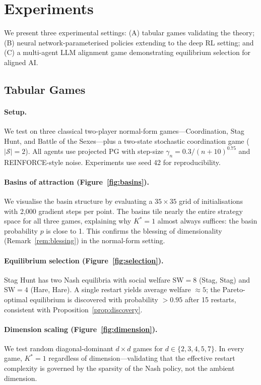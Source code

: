 \documentclass{article}
\newcommand{\calS}{\mathcal{S}}
\newcommand{\SW}{\mathrm{SW}}
\begin{document}
\section{Experiments}
\label{sec:experiments}

We present three experimental settings: (A) tabular games validating
the theory; (B) neural network-parameterised policies extending to
the deep RL setting; and (C) a multi-agent LLM alignment game
demonstrating equilibrium selection for aligned AI.

\subsection{Tabular Games}
\label{sec:exp:tab}

\paragraph{Setup.} We test on three classical two-player normal-form
games---Coordination, Stag Hunt, and Battle of the Sexes---plus a
two-state stochastic coordination game ($|\calS| = 2$). All agents use
projected PG with step-size $\gamma_n = 0.3/(n+10)^{0.75}$ and
REINFORCE-style noise. Experiments use seed 42 for reproducibility.

\paragraph{Basins of attraction (Figure~\ref{fig:basins}).}
We visualise the basin structure by evaluating a $35 \times 35$ grid
of initialisations with 2,000 gradient steps per point.
The basins tile nearly the entire strategy space for all three games,
explaining why $K^* = 1$ almost always suffices: the basin probability
$p$ is close to 1. This confirms the blessing of dimensionality
(Remark~\ref{rem:blessing}) in the normal-form setting.

\paragraph{Equilibrium selection (Figure~\ref{fig:selection}).}
Stag Hunt has two Nash equilibria with social welfare $\SW = 8$
(Stag, Stag) and $\SW = 4$ (Hare, Hare). A single restart yields
average welfare $\approx 5$; the Pareto-optimal equilibrium is
discovered with probability $> 0.95$ after 15 restarts, consistent
with Proposition~\ref{prop:discovery}.

\paragraph{Dimension scaling (Figure~\ref{fig:dimension}).}
We test random diagonal-dominant $d \times d$ games for
$d \in \{2, 3, 4, 5, 7\}$. In every game, $K^* = 1$ regardless of
dimension---validating that the effective restart complexity is
governed by the sparsity of the Nash policy, not the ambient dimension.
\end{document}
